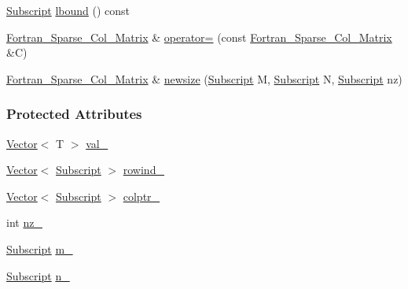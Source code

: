 \begin{DoxyCompactItemize}
\item 
\hyperlink{namespace_t_n_t_af22e3f1460e145c04ce4e7d701e4c1c1}{Subscript} \hyperlink{class_t_n_t_1_1_fortran___sparse___col___matrix_a3f50a1460bcf536305a6235666734fde}{lbound} () const 
\item 
\hyperlink{class_t_n_t_1_1_fortran___sparse___col___matrix}{Fortran\_\-Sparse\_\-Col\_\-Matrix} \& \hyperlink{class_t_n_t_1_1_fortran___sparse___col___matrix_aef7f8a21b30905becd4f2f55483a8237}{operator=} (const \hyperlink{class_t_n_t_1_1_fortran___sparse___col___matrix}{Fortran\_\-Sparse\_\-Col\_\-Matrix} \&C)
\item 
\hyperlink{class_t_n_t_1_1_fortran___sparse___col___matrix}{Fortran\_\-Sparse\_\-Col\_\-Matrix} \& \hyperlink{class_t_n_t_1_1_fortran___sparse___col___matrix_a220b75970e2e444151481041eb700af6}{newsize} (\hyperlink{namespace_t_n_t_af22e3f1460e145c04ce4e7d701e4c1c1}{Subscript} M, \hyperlink{namespace_t_n_t_af22e3f1460e145c04ce4e7d701e4c1c1}{Subscript} N, \hyperlink{namespace_t_n_t_af22e3f1460e145c04ce4e7d701e4c1c1}{Subscript} nz)
\end{DoxyCompactItemize}
\subsubsection*{Protected Attributes}
\begin{DoxyCompactItemize}
\item 
\hyperlink{class_t_n_t_1_1_vector}{Vector}$<$ T $>$ \hyperlink{class_t_n_t_1_1_fortran___sparse___col___matrix_a4e0a5a75adbb528cb76f8a2fe36d5ded}{val\_\-}
\item 
\hyperlink{class_t_n_t_1_1_vector}{Vector}$<$ \hyperlink{namespace_t_n_t_af22e3f1460e145c04ce4e7d701e4c1c1}{Subscript} $>$ \hyperlink{class_t_n_t_1_1_fortran___sparse___col___matrix_a7b1d2caa6bc2b26bba31dabe76ad8e6b}{rowind\_\-}
\item 
\hyperlink{class_t_n_t_1_1_vector}{Vector}$<$ \hyperlink{namespace_t_n_t_af22e3f1460e145c04ce4e7d701e4c1c1}{Subscript} $>$ \hyperlink{class_t_n_t_1_1_fortran___sparse___col___matrix_a45a3d26870791a4220e9a6dcf6fd73f5}{colptr\_\-}
\item 
int \hyperlink{class_t_n_t_1_1_fortran___sparse___col___matrix_aa954fe021dc8343164265895b88b4638}{nz\_\-}
\item 
\hyperlink{namespace_t_n_t_af22e3f1460e145c04ce4e7d701e4c1c1}{Subscript} \hyperlink{class_t_n_t_1_1_fortran___sparse___col___matrix_ae0e779ccb748fd33ae57a092456b46c9}{m\_\-}
\item 
\hyperlink{namespace_t_n_t_af22e3f1460e145c04ce4e7d701e4c1c1}{Subscript} \hyperlink{class_t_n_t_1_1_fortran___sparse___col___matrix_ae4527d6b3fd69f45f3acc9198c75bd7e}{n\_\-}
\end{DoxyCompactItemize}


